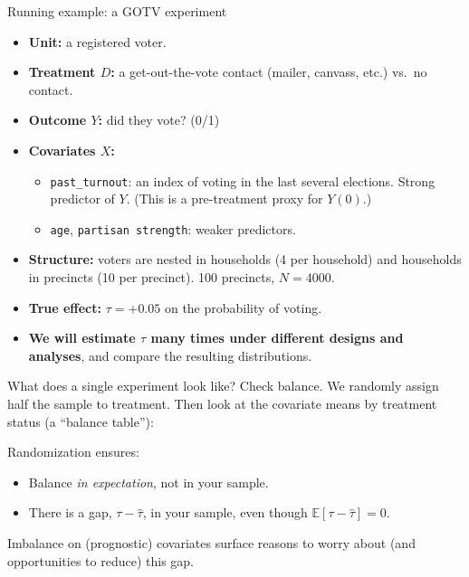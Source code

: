 \documentclass[xcolor=dvipsnames]{beamer}
\newcommand\E{\mathbb{E}}
\begin{document}
\begin{frame}{Running example: a GOTV experiment}
\small
\begin{itemize}
\item \textbf{Unit:} a registered voter.
\item \textbf{Treatment $D$:} a get-out-the-vote contact (mailer, canvass,
  etc.) vs.\ no contact.
\item \textbf{Outcome $Y$:} did they vote? (0/1)
\item \textbf{Covariates $X$:}
  \begin{itemize}
  \footnotesize
  \item \texttt{past\_turnout}: an index of voting in the last several
    elections. Strong predictor of $Y$. (This is a pre-treatment proxy
    for $Y(0)$.)
  \item \texttt{age}, \texttt{partisan strength}: weaker predictors.
  \end{itemize}
\item \textbf{Structure:} voters are nested in households (4 per household)
  and households in precincts (10 per precinct). 100 precincts, $N=4000$.
\item \textbf{True effect:} $\tau = +0.05$ on the probability of voting.
\item \textbf{We will estimate $\hat\tau$ many times under different designs
  and analyses}, and compare the resulting distributions.
\end{itemize}
\end{frame}


\begin{frame}{What does a single experiment look like? Check balance.}
\small
We randomly assign half the sample to treatment. Then look at the
covariate means by treatment status (a ``balance table''):

\bigskip
\begin{center}

\end{center}
 Randomization ensures:\\
\begin{itemize}
\footnotesize
\item<3-> Balance \textit{in expectation}, not in
  your sample.
\item<4-> There is a gap, $\tau - \hat\tau$, in your sample, even though $\E[\tau - \hat\tau] = 0$.
\end{itemize}
\small
{} Imbalance on (prognostic) covariates surface reasons to worry about (and opportunities to reduce) this gap.
\end{frame}
\end{document}

